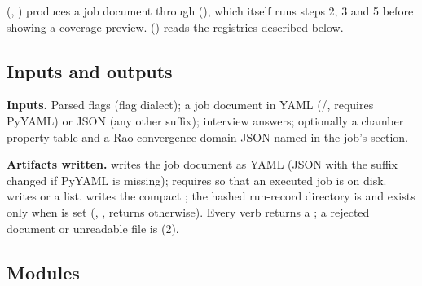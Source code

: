   (, ) produces a job document through  (), which itself runs steps 2, 3 and 5 before showing a coverage preview.   () reads the registries described below.

\subsection{Inputs and outputs}\label{sec:s02-io}

\textbf{Inputs.} Parsed flags (flag dialect); a job document in YAML (/, requires PyYAML) or JSON (any other suffix); interview answers; optionally a chamber property table and a Rao convergence-domain JSON named in the job's  section.

\textbf{Artifacts written.}     writes the job document as YAML (JSON with the suffix changed if PyYAML is missing);  requires  so that an executed job is on disk.      writes  or a  list.      writes the compact ; the hashed run-record directory is  and exists only when  is set (, , returns  otherwise). Every verb returns a ; a rejected document or unreadable file is  (2).

\subsection{Modules}\label{sec:s02-modules}

